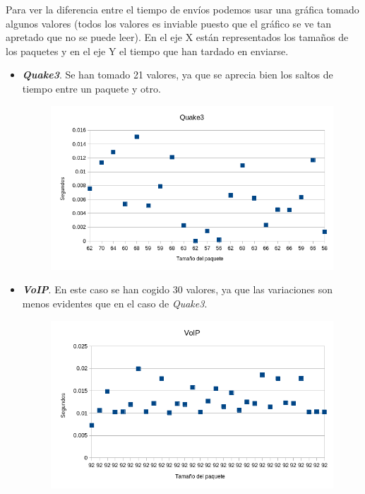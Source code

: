 \documentclass[11pt,a4paper]{article}
\begin{document}
Para ver la diferencia entre el tiempo de envíos podemos usar una gráfica tomado algunos valores (todos los valores es inviable puesto que el gráfico se ve tan apretado que no se puede leer). En el eje X están representados los tamaños de los paquetes y en el eje Y el tiempo que han tardado en enviarse.

\begin{itemize}
	\item \textbf{\textit{Quake3}}. Se han tomado 21 valores, ya que se aprecia bien los saltos de tiempo entre un paquete y otro.
	\begin{figure}[H]
		\centering
		\includegraphics[scale=0.7]{img/quake3-grafica.png}
	\end{figure}
	
	\item \textbf{\textit{VoIP}}. En este caso se han cogido 30 valores, ya que las variaciones son menos evidentes que en el caso de \textit{Quake3}.
	\begin{figure}[H]
		\centering
		\includegraphics[scale=0.7]{img/voip-grafica.png}
	\end{figure}
\end{itemize}
\end{document}
